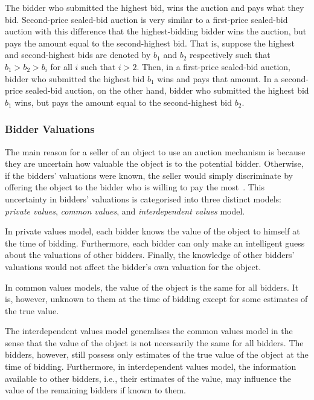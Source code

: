  The bidder who submitted the highest bid, wins the auction and pays what they bid. Second-price sealed-bid auction is very similar to a first-price sealed-bid auction with this difference that the highest-bidding bidder wins the auction, but pays the amount equal to the second-highest bid. That is, suppose the highest and second-highest bids are denoted by $b_1$ and $b_2$ respectively such that $b_1 > b_2 > b_i$ for all $i$ such that $i > 2$. Then, in a first-price sealed-bid auction, bidder who submitted the highest bid $b_1$ wins and pays that amount. In a second-price sealed-bid auction, on the other hand, bidder who submitted the highest bid $b_1$ wins, but pays the amount equal to the second-highest bid $b_2$.

\subsubsection{Bidder Valuations} %
\label{ssub:bidder_valuations_dmp}
The main reason for a seller of an object to use an auction mechanism is because they are uncertain how valuable the object is to the potential bidder. Otherwise, if the bidders' valuations were known, the seller would simply discriminate by offering the object to the bidder who is willing to pay the most~\cite{Krishna10}. This uncertainty in bidders' valuations is categorised into three distinct models: \emph{private values}, \emph{common values}, and \emph{interdependent values} model.

In private values model, each bidder knows the value of the object to himself at the time of bidding. Furthermore, each bidder can only make an intelligent guess about the valuations of other bidders. Finally, the knowledge of other bidders' valuations would not affect the bidder's own valuation for the object.

In common values models, the value of the object is the same for all bidders. It is, however, unknown to them at the time of bidding except for some estimates of the true value.

The interdependent values model generalises the common values model in the sense that the value of the object is not necessarily the same for all bidders. The bidders, however, still possess only estimates of the true value of the object at the time of bidding. Furthermore, in interdependent values model, the information available to other bidders, i.e., their estimates of the value, may influence the value of the remaining bidders if known to them.


